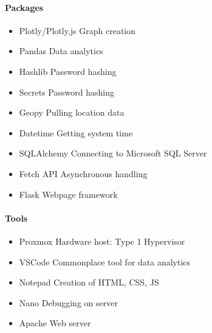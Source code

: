 \documentclass{article}
\begin{document}
			\paragraph{Packages}
				\begin{itemize}
					\item Plotly/Plotly.js
						\subitem Graph creation
					\item Pandas
						\subitem Data analytics
					\item Hashlib
						\subitem Password hashing
					\item Secrets
						\subitem Password hashing
					\item Geopy
						\subitem Pulling location data
					\item Datetime
						\subitem Getting system time
					\item SQLAlchemy
						\subitem Connecting to Microsoft SQL Server
					\item Fetch API
						\subitem Asynchronous handling
					\item Flask
						\subitem Webpage framework 
				\end{itemize}
			\paragraph{Tools}
				\begin{itemize}
					\item Proxmox 
						\subitem Hardware host: Type 1 Hypervisor
					\item VSCode
						\subitem Commonplace tool for data analytics
					\item Notepad
						\subitem Creation of HTML, CSS, JS
					\item Nano
						\subitem Debugging on server
					\item Apache
						\subitem Web server
				\end{itemize}
\end{document}

